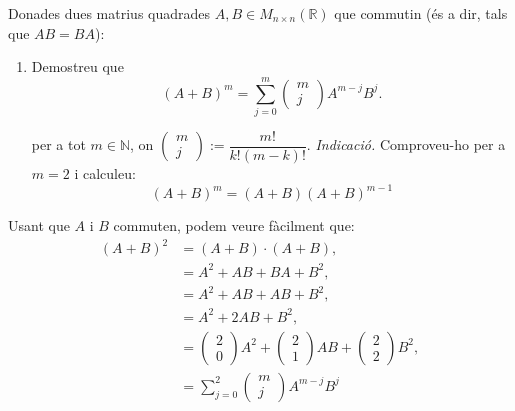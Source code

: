 \begin{exercise}[1.8.9]
    Donades dues matrius quadrades $A,B\in M_{n\times n}(\mathbb{R})$ que commutin (és a dir, tals que $AB =BA$):
    
    \begin{enumerate}[label=(\roman*)]
        \item Demostreu que
        \[
        (A+B)^m = \sum_{j=0}^m \begin{pmatrix} m \\j \end{pmatrix} A^{m-j}B^j.
        \]

        per a tot $m\in \mathbb{N}$, on $\begin{pmatrix} m \\j \end{pmatrix}:= \dfrac{m!}{k!(m-k)!}$. \textit{Indicació.} Comproveu-ho per a $m=2$ i calculeu:
        \[(A+B)^m = (A+B)(A+B)^{m-1}\]
    \end{enumerate}
    \begin{solution}
    Usant que $A$ i $B$ commuten, podem veure fàcilment que:
    \begin{align}
    (A+B)^2 &= (A+B)\cdot (A+B),\\
    &= A^2+AB + BA + B^2 ,\\
    &= A^2+AB + AB + B^2 ,\\
    &= A^2+2AB + B^2 ,\\
    &= \begin{pmatrix} 2 \\0 \end{pmatrix}A^2 + \begin{pmatrix} 2 \\1 \end{pmatrix}AB + \begin{pmatrix} 2 \\2 \end{pmatrix}B^2, \\
    &= \sum_{j=0}^2 \begin{pmatrix} m \\j \end{pmatrix} A^{m-j}B^j
    \end{align}


\end{solution}
\end{exercise}

